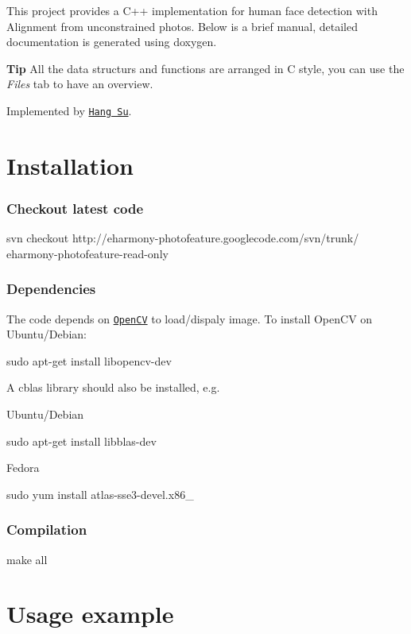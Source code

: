 

This project provides a C++ implementation for human face detection with Alignment from unconstrained photos. Below is a brief manual, detailed documentation is generated using doxygen. \par
 {\bfseries Tip} All the data structurs and functions are arranged in C style, you can use the {\itshape Files} tab to have an overview. \par
\par
 Implemented by \href{http://cs.umass.edu/~hsu}{\tt Hang Su}.

    \section*{Installation}

 \subsubsection*{Checkout latest code}

 svn checkout http\-://eharmony-\/photofeature.\-googlecode.\-com/svn/trunk/ eharmony-\/photofeature-\/read-\/only \subsubsection*{Dependencies}

 

The code depends on \href{http://opencv.willowgarage.com/}{\tt Open\-C\-V} to load/dispaly image. To install Open\-C\-V on Ubuntu/\-Debian\-: 

 sudo apt-\/get install libopencv-\/dev 

A cblas library should also be installed, e.\-g. \par
 Ubuntu/\-Debian 



sudo apt-\/get install libblas-\/dev

 Fedora 

 sudo yum install atlas-\/sse3-\/devel.\-x86\-\_

\subsubsection*{Compilation}

 make all

\section*{Usage example}

